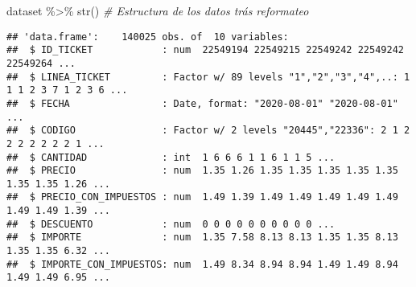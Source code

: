 \documentclass[
]{article}
\newenvironment{Shaded}{\begin{snugshade}}{\end{snugshade}}
\newcommand{\CommentTok}[1]{\textcolor[rgb]{0.56,0.35,0.01}{\textit{#1}}}
\newcommand{\FunctionTok}[1]{\textcolor[rgb]{0.00,0.00,0.00}{#1}}
\newcommand{\NormalTok}[1]{#1}
\newcommand{\SpecialCharTok}[1]{\textcolor[rgb]{0.00,0.00,0.00}{#1}}
\begin{document}
\begin{Shaded}
\begin{Highlighting}[]
\NormalTok{dataset }\SpecialCharTok{\%\textgreater{}\%} \FunctionTok{str}\NormalTok{() }\CommentTok{\# Estructura de los datos trás reformateo}
\end{Highlighting}
\end{Shaded}

\begin{verbatim}
## 'data.frame':    140025 obs. of  10 variables:
##  $ ID_TICKET            : num  22549194 22549215 22549242 22549242 22549264 ...
##  $ LINEA_TICKET         : Factor w/ 89 levels "1","2","3","4",..: 1 1 1 2 3 7 1 2 3 6 ...
##  $ FECHA                : Date, format: "2020-08-01" "2020-08-01" ...
##  $ CODIGO               : Factor w/ 2 levels "20445","22336": 2 1 2 2 2 2 2 2 2 1 ...
##  $ CANTIDAD             : int  1 6 6 6 1 1 6 1 1 5 ...
##  $ PRECIO               : num  1.35 1.26 1.35 1.35 1.35 1.35 1.35 1.35 1.35 1.26 ...
##  $ PRECIO_CON_IMPUESTOS : num  1.49 1.39 1.49 1.49 1.49 1.49 1.49 1.49 1.49 1.39 ...
##  $ DESCUENTO            : num  0 0 0 0 0 0 0 0 0 0 ...
##  $ IMPORTE              : num  1.35 7.58 8.13 8.13 1.35 1.35 8.13 1.35 1.35 6.32 ...
##  $ IMPORTE_CON_IMPUESTOS: num  1.49 8.34 8.94 8.94 1.49 1.49 8.94 1.49 1.49 6.95 ...
\end{verbatim}

\normalsize
\end{document}
